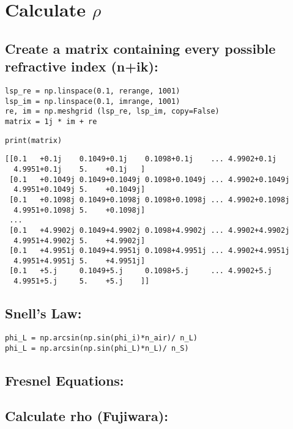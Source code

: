 \documentclass[11pt]{article}
\begin{document}
\section{Calculate \(\rho\)}
\label{sec:org10139ac}
\subsection{Create a matrix containing every possible refractive index (n+ik):}
\label{sec:org0ab67dd}
\begin{verbatim}
lsp_re = np.linspace(0.1, rerange, 1001)
lsp_im = np.linspace(0.1, imrange, 1001)
re, im = np.meshgrid (lsp_re, lsp_im, copy=False)
matrix = 1j * im + re
\end{verbatim}

\begin{verbatim}
print(matrix)
\end{verbatim}

\begin{verbatim}
[[0.1   +0.1j    0.1049+0.1j    0.1098+0.1j    ... 4.9902+0.1j
  4.9951+0.1j    5.    +0.1j   ]
 [0.1   +0.1049j 0.1049+0.1049j 0.1098+0.1049j ... 4.9902+0.1049j
  4.9951+0.1049j 5.    +0.1049j]
 [0.1   +0.1098j 0.1049+0.1098j 0.1098+0.1098j ... 4.9902+0.1098j
  4.9951+0.1098j 5.    +0.1098j]
 ...
 [0.1   +4.9902j 0.1049+4.9902j 0.1098+4.9902j ... 4.9902+4.9902j
  4.9951+4.9902j 5.    +4.9902j]
 [0.1   +4.9951j 0.1049+4.9951j 0.1098+4.9951j ... 4.9902+4.9951j
  4.9951+4.9951j 5.    +4.9951j]
 [0.1   +5.j     0.1049+5.j     0.1098+5.j     ... 4.9902+5.j
  4.9951+5.j     5.    +5.j    ]]
\end{verbatim}
\subsection{Snell's Law:}
\label{sec:org58f36ce}
\begin{verbatim}
phi_L = np.arcsin(np.sin(phi_i)*n_air)/ n_L) 
phi_L = np.arcsin(np.sin(phi_L)*n_L)/ n_S) 
\end{verbatim}

\subsection{Fresnel Equations:}
\label{sec:org890aceb}
\subsection{Calculate rho (Fujiwara):}
\label{sec:org91b0e2e}
\end{document}
